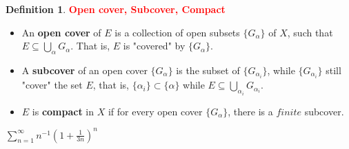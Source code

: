 \documentclass[12pt,a4paper]{article}
\theoremstyle{definition}
\newtheorem{dfn}[thm]{Definition}
\begin{document}
\begin{dfn} \textcolor{RED}{\bf Open cover, Subcover, Compact}
    \begin{itemize} Let $X$ be a metric space, subset $E \subset X$:
        \item An {\bf open cover} of $E$ is a collection of open subsets $\{G_{\alpha}\}$ of $X$, such that $E \subseteq \bigcup_{\alpha}G_{\alpha}$. That is, $E$ is "covered" by $\{G_{\alpha}\}$.
        \item A {\bf subcover} of an open cover $\{G_{\alpha}\}$ is the subset of $\{G_{\alpha_{i}}\}$, while $\{G_{\alpha_{i}}\}$ still "cover" the set $E$, that is, $\{\alpha_{i}\}\subset \{\alpha\}$ while $E \subseteq \bigcup_{\alpha_{i}}G_{\alpha_{i}}$.
        \item $E$ is {\bf compact} in $X$ if for every open cover $\{G_{\alpha}\}$, there is a $finite$ subcover.
    \end{itemize}
\end{dfn}

$\sum_{n=1}^{\infty}n^{-1}(1+\frac{1}{3n})^{n}$
\end{document}
